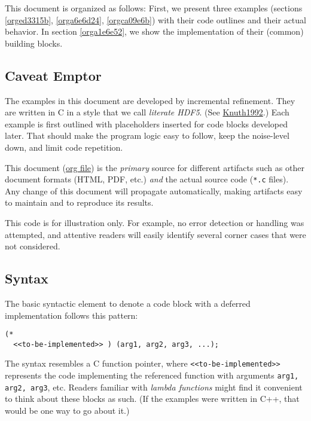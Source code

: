 \documentclass[a4paper, 12pt]{article}
\begin{document}
This document is organized as follows: First, we present three examples
(sections \ref{orged3315b}, \ref{orga6e6d24}, \ref{orgca09e6b}) with
their code outlines and their actual behavior. In section
\ref{orga1e6e52}, we show the implementation of their (common) building
blocks.

\subsection{Caveat Emptor}
\label{sec:orgae5f3c1}

The examples in this document are developed by incremental refinement. They
are written in C in a style that we call \emph{literate HDF5}. (See \href{https://en.wikipedia.org/wiki/Literate\_programming}{Knuth1992}.)
Each example is first outlined with placeholders inserted for code blocks
developed later. That should make the program logic easy to follow, keep the
noise-level down, and limit code repetition.

This document (\href{https://www.jstatsoft.org/article/view/v046i03}{org file}) is the \emph{primary} source for different artifacts
such as other document formats (HTML, PDF, etc.) \emph{and} the actual source
code (\texttt{*.c} files). Any change of this document will propagate
automatically, making artifacts easy to maintain and to reproduce its
results.

This code is for illustration only. For example, no error detection or
handling was attempted, and attentive readers will easily identify several
corner cases that were not considered.

\subsection{Syntax}
\label{sec:org6c17268}

The basic syntactic element to denote a code block with a deferred
implementation follows this pattern:

\begin{verbatim}
(*
  <<to-be-implemented>> ) (arg1, arg2, arg3, ...);
\end{verbatim}

The syntax resembles a C function pointer, where \texttt{<<to-be-implemented>>}
represents the code implementing the referenced function with arguments
\texttt{arg1, arg2, arg3}, etc. Readers familiar with \emph{lambda functions} might find
it convenient to think about these blocks as such. (If the examples were
written in C++, that would be one way to go about it.)
\end{document}
